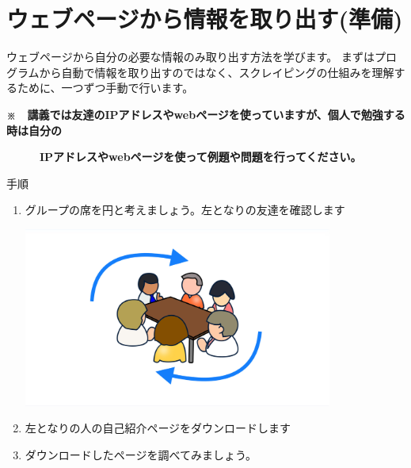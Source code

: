 \documentclass[a4paper,12pt,dvipdfmx]{jarticle}
\begin{document}
\bigskip


\bigskip

\clearpage\section{ウェブページから情報を取り出す(準備)}
ウェブページから自分の必要な情報のみ取り出す方法を学びます。
まずはプログラムから自動で情報を取り出すのではなく、スクレイピングの仕組みを理解するために、一つずつ手動で行います。



\bigskip

{\bfseries\color[rgb]{1.0,0.2,0.2}
※　講義では友達のIPアドレスやwebページを使っていますが、個人で勉強する時は自分の　　　　}

{\bfseries\color[rgb]{1.0,0.2,0.2}
　　　IPアドレスやwebページを使って例題や問題を行ってください。}

手順
\begin{enumerate}

	\item
グループの席を円と考えましょう。左となりの友達を確認します


\bigskip



\begin{center}
\includegraphics[width=10.174cm,height=5.897cm]{textbook-img001.jpg}

\end{center}

\bigskip


\bigskip


\bigskip



\item
左となりの人の自己紹介ページをダウンロードします

\item
ダウンロードしたページを調べてみましょう。
\end{enumerate}
\end{document}
